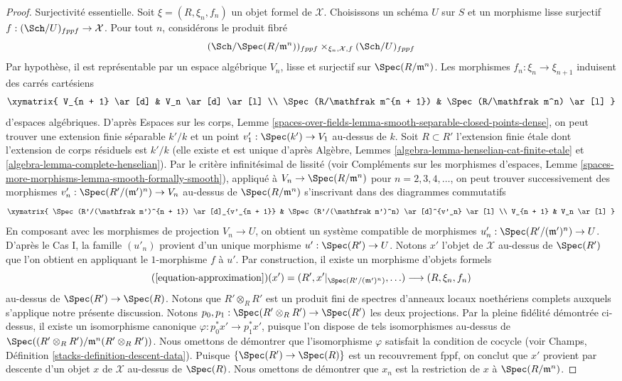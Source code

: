 \begin{proof}
\medskip\noindent
Surjectivité essentielle. Soit $\xi = (R, \xi_n, f_n)$ un objet formel de
$\mathcal{X}$. Choisissons un schéma $U$ sur $S$ et un morphisme lisse surjectif
$f : (\Sch/U)_{fppf} \to \mathcal{X}$. Pour tout $n$, considérons le produit fibré
$$
(\Sch/\Spec(R/\mathfrak m^n))_{fppf}
\times_{\xi_n, \mathcal{X}, f}
(\Sch/U)_{fppf}
$$
Par hypothèse, il est représentable par un espace algébrique $V_n$, lisse et
surjectif sur $\Spec(R/\mathfrak m^n)$. Les morphismes
$f_n : \xi_n \to \xi_{n + 1}$ induisent des carrés cartésiens
$$
\xymatrix{
V_{n + 1} \ar[d] & V_n \ar[d] \ar[l] \\
\Spec(R/\mathfrak m^{n + 1}) & \Spec(R/\mathfrak m^n) \ar[l]
}
$$
d'espaces algébriques. D'après Espaces sur les corps, Lemme
\ref{spaces-over-fields-lemma-smooth-separable-closed-points-dense},
on peut trouver une extension finie séparable $k'/k$ et un point
$v'_1 : \Spec(k') \to V_1$ au-dessus de $k$. Soit $R \subset R'$ l'extension finie \'etale
dont l'extension de corps résiduels est $k'/k$ (elle existe et
est unique d'après
Algèbre, Lemmes \ref{algebra-lemma-henselian-cat-finite-etale} et
\ref{algebra-lemma-complete-henselian}).
Par le critère infinitésimal de lissité (voir
Compléments sur les morphismes d'espaces, Lemme
\ref{spaces-more-morphisms-lemma-smooth-formally-smooth}),
appliqué à $V_n \to \Spec(R/\mathfrak m^n)$ pour $n = 2, 3, 4, \ldots$,
on peut trouver successivement des morphismes
$v'_n : \Spec(R'/(\mathfrak m')^n) \to V_n$ au-dessus de $\Spec(R/\mathfrak m^n)$
s'inscrivant dans des diagrammes commutatifs
$$
\xymatrix{
\Spec(R'/(\mathfrak m')^{n + 1}) \ar[d]_{v'_{n + 1}} &
\Spec(R'/(\mathfrak m')^n) \ar[d]^{v'_n} \ar[l] \\
V_{n + 1} & V_n \ar[l]
}
$$
En composant avec les morphismes de projection $V_n \to U$, on obtient un système
compatible de morphismes $u'_n : \Spec(R'/(\mathfrak m')^n) \to U$.
D'après le Cas I, la famille $(u'_n)$ provient d'un unique
morphisme $u' : \Spec(R') \to U$. Notons $x'$ l'objet de $\mathcal{X}$
au-dessus de $\Spec(R')$ que l'on obtient en appliquant le $1$-morphisme $f$ à $u'$.
Par construction, il existe un morphisme d'objets formels
$$
(\ref{equation-approximation})(x') =
(R', x'|_{\Spec(R'/(\mathfrak m')^n)}, \ldots)
\longrightarrow
(R, \xi_n, f_n)
$$
au-dessus de $\Spec(R') \to \Spec(R)$. Notons que $R' \otimes_R R'$ est un produit fini
de spectres d'anneaux locaux noethériens complets auxquels s'applique notre présente
discussion. Notons $p_0, p_1 : \Spec(R' \otimes_R R') \to \Spec(R')$
les deux projections. Par la pleine fidélité démontrée ci-dessus, il existe
un isomorphisme canonique $\varphi : p_0^*x' \to p_1^*x'$, puisque l'on dispose de
tels isomorphismes au-dessus de
$\Spec((R' \otimes_R R')/\mathfrak m^n(R' \otimes_R R'))$.
Nous omettons de démontrer que l'isomorphisme $\varphi$ satisfait la condition de cocycle
(voir Champs, Définition \ref{stacks-definition-descent-data}).
Puisque $\{\Spec(R') \to \Spec(R)\}$ est un recouvrement fppf, on conclut
que $x'$ provient par descente d'un objet $x$ de $\mathcal{X}$ au-dessus de $\Spec(R)$.
Nous omettons de démontrer que $x_n$ est la restriction de $x$ à
$\Spec(R/\mathfrak m^n)$.
\end{proof}

